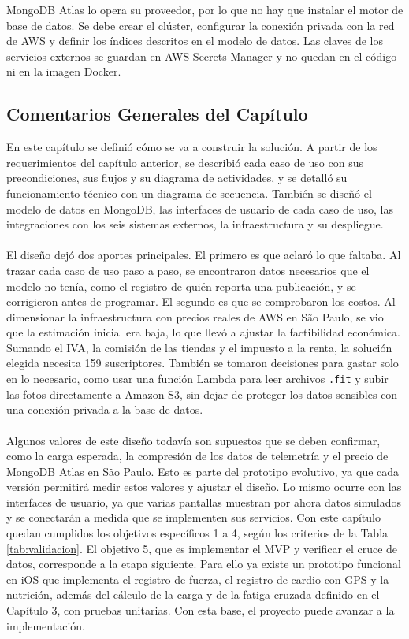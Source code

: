 MongoDB Atlas lo opera su proveedor, por lo que no hay que instalar el motor de base de datos. Se debe crear el clúster, configurar la conexión privada con la red de AWS y definir los índices descritos en el modelo de datos. Las claves de los servicios externos se guardan en AWS Secrets Manager y no quedan en el código ni en la imagen Docker.

\newpage
\subsection{Comentarios Generales del Capítulo}
En este capítulo se definió cómo se va a construir la solución. A partir de los requerimientos del capítulo anterior, se describió cada caso de uso con sus precondiciones, sus flujos y su diagrama de actividades, y se detalló su funcionamiento técnico con un diagrama de secuencia. También se diseñó el modelo de datos en MongoDB, las interfaces de usuario de cada caso de uso, las integraciones con los seis sistemas externos, la infraestructura y su despliegue.
\\\\
El diseño dejó dos aportes principales. El primero es que aclaró lo que faltaba. Al trazar cada caso de uso paso a paso, se encontraron datos necesarios que el modelo no tenía, como el registro de quién reporta una publicación, y se corrigieron antes de programar. El segundo es que se comprobaron los costos. Al dimensionar la infraestructura con precios reales de AWS en São Paulo, se vio que la estimación inicial era baja, lo que llevó a ajustar la factibilidad económica. Sumando el IVA, la comisión de las tiendas y el impuesto a la renta, la solución elegida necesita 159 suscriptores. También se tomaron decisiones para gastar solo en lo necesario, como usar una función Lambda para leer archivos \texttt{.fit} y subir las fotos directamente a Amazon S3, sin dejar de proteger los datos sensibles con una conexión privada a la base de datos.
\\\\
Algunos valores de este diseño todavía son supuestos que se deben confirmar, como la carga esperada, la compresión de los datos de telemetría y el precio de MongoDB Atlas en São Paulo. Esto es parte del prototipo evolutivo, ya que cada versión permitirá medir estos valores y ajustar el diseño. Lo mismo ocurre con las interfaces de usuario, ya que varias pantallas muestran por ahora datos simulados y se conectarán a medida que se implementen sus servicios. Con este capítulo quedan cumplidos los objetivos específicos 1 a 4, según los criterios de la Tabla \ref{tab:validacion}. El objetivo 5, que es implementar el MVP y verificar el cruce de datos, corresponde a la etapa siguiente. Para ello ya existe un prototipo funcional en iOS que implementa el registro de fuerza, el registro de cardio con GPS y la nutrición, además del cálculo de la carga y de la fatiga cruzada definido en el Capítulo 3, con pruebas unitarias. Con esta base, el proyecto puede avanzar a la implementación.

